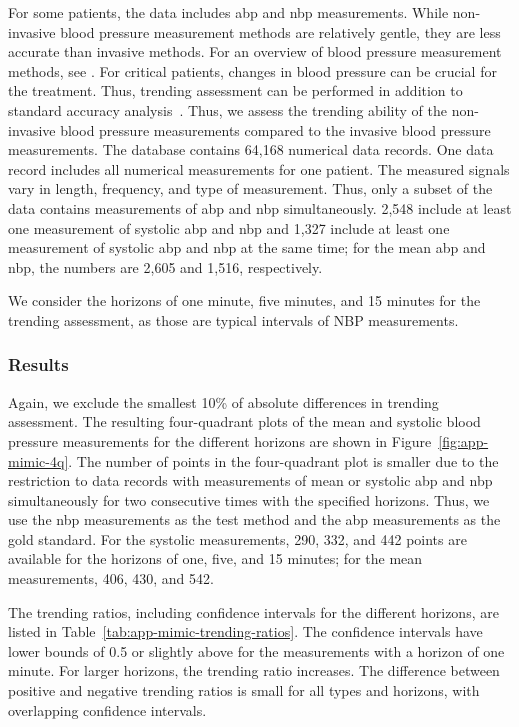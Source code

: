 \documentclass[pdflatex]{sn-jnl}
\theoremstyle{plain}%
\theoremstyle{definition}
\begin{document}
For some patients, the data includes \ac{abp} and \ac{nbp} measurements.
While non-invasive blood pressure measurement methods are relatively gentle, they are less accurate than invasive methods.
For an overview of blood pressure measurement methods, see \citet{Saugel2014}.
For critical patients, changes in blood pressure can be crucial for the treatment.
Thus, trending assessment can be performed in addition to standard accuracy analysis~\citep[see, for example, ][]{Mostafa2020}.
Thus, we assess the trending ability of the non-invasive blood pressure measurements compared to the invasive blood pressure measurements.
The database contains 64,168 numerical data records.
One data record includes all numerical measurements for one patient.
The measured signals vary in length, frequency, and type of measurement.
Thus, only a subset of the data contains measurements of \ac{abp} and \ac{nbp} simultaneously.
2,548 include at least one measurement of systolic \ac{abp} and \ac{nbp} and 1,327 include at least one measurement of systolic \ac{abp} and \ac{nbp} at the same time; for the mean \ac{abp} and \ac{nbp}, the numbers are 2,605 and 1,516, respectively.

We consider the horizons of one minute, five minutes, and 15 minutes for the trending assessment, as those are typical intervals of NBP measurements.

\subsubsection*{Results}

Again, we exclude the smallest 10\% of absolute differences in trending assessment.
The resulting four-quadrant plots of the mean and systolic blood pressure measurements for the different horizons are shown in Figure~\ref{fig:app-mimic-4q}.
The number of points in the four-quadrant plot is smaller due to the restriction to data records with measurements of mean or systolic \ac{abp} and \ac{nbp} simultaneously for two consecutive times with the specified horizons.
Thus, we use the \ac{nbp} measurements as the test method and the \ac{abp} measurements as the gold standard.
For the systolic measurements, 290, 332, and 442 points are available for the horizons of one, five, and 15 minutes; for the mean measurements, 406, 430, and 542.

The trending ratios, including confidence intervals for the different horizons, are listed in Table~\ref{tab:app-mimic-trending-ratios}.
The confidence intervals have lower bounds of 0.5 or slightly above for the measurements with a horizon of one minute.
For larger horizons, the trending ratio increases.
The difference between positive and negative trending ratios is small for all types and horizons, with overlapping confidence intervals.
\end{document}
